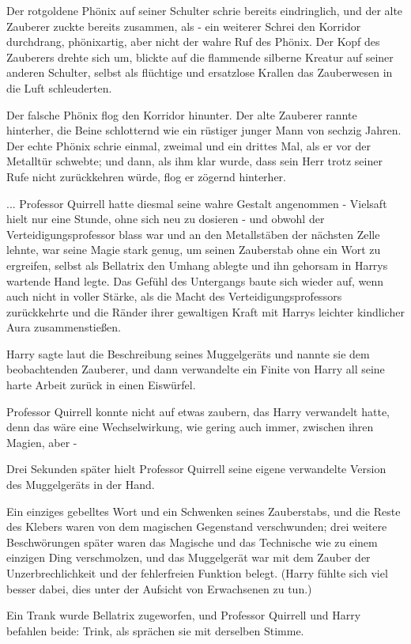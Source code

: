 Der rotgoldene Phönix auf seiner Schulter schrie bereits eindringlich, und der
alte Zauberer zuckte bereits zusammen, als - ein weiterer Schrei den Korridor
durchdrang, phönixartig, aber nicht der wahre Ruf des Phönix. Der Kopf des
Zauberers drehte sich um, blickte auf die flammende silberne Kreatur auf seiner
anderen Schulter, selbst als flüchtige und ersatzlose Krallen das Zauberwesen in
die Luft schleuderten.

Der falsche Phönix flog den Korridor hinunter. Der alte Zauberer rannte
hinterher, die Beine schlotternd wie ein rüstiger junger Mann von sechzig
Jahren. Der echte Phönix schrie einmal, zweimal und ein drittes Mal, als er vor
der Metalltür schwebte; und dann, als ihm klar wurde, dass sein Herr trotz
seiner Rufe nicht zurückkehren würde, flog er zögernd hinterher.

... Professor Quirrell hatte diesmal seine wahre Gestalt angenommen - Vielsaft
hielt nur eine Stunde, ohne sich neu zu dosieren - und obwohl der
Verteidigungsprofessor blass war und an den Metallstäben der nächsten Zelle
lehnte, war seine Magie stark genug, um seinen Zauberstab ohne ein Wort zu
ergreifen, selbst als Bellatrix den Umhang ablegte und ihn gehorsam in Harrys
wartende Hand legte. Das Gefühl des Untergangs baute sich wieder auf, wenn auch
nicht in voller Stärke, als die Macht des Verteidigungsprofessors zurückkehrte
und die Ränder ihrer gewaltigen Kraft mit Harrys leichter kindlicher Aura
zusammenstießen.

Harry sagte laut die Beschreibung seines Muggelgeräts und nannte sie dem
beobachtenden Zauberer, und dann verwandelte ein Finite von Harry all seine
harte Arbeit zurück in einen Eiswürfel.

Professor Quirrell konnte nicht auf etwas zaubern, das Harry verwandelt hatte,
denn das wäre eine Wechselwirkung, wie gering auch immer, zwischen ihren Magien,
aber -

Drei Sekunden später hielt Professor Quirrell seine eigene verwandelte Version
des Muggelgeräts in der Hand.

Ein einziges gebelltes Wort und ein Schwenken seines Zauberstabs, und die Reste
des Klebers waren von dem magischen Gegenstand verschwunden; drei weitere
Beschwörungen später waren das Magische und das Technische wie zu einem einzigen
Ding verschmolzen, und das Muggelgerät war mit dem Zauber der Unzerbrechlichkeit
und der fehlerfreien Funktion belegt. (Harry fühlte sich viel besser dabei, dies
unter der Aufsicht von Erwachsenen zu tun.)

Ein Trank wurde Bellatrix zugeworfen, und Professor Quirrell und Harry befahlen
beide: \glqq Trink\grqq{}, als sprächen sie mit derselben Stimme.

